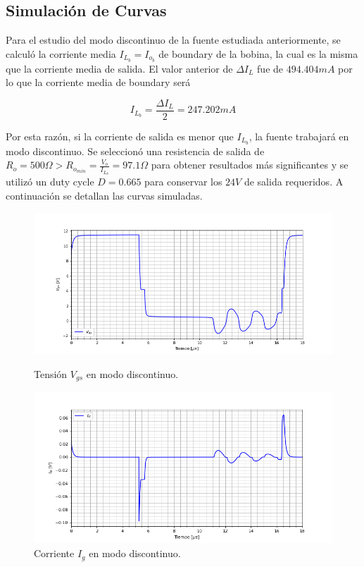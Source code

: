 



\subsection{Simulación de Curvas}

Para el estudio del modo discontinuo de la fuente estudiada anteriormente, se calculó la corriente media $I_{L_b} = I_{o_b}$ de boundary de la bobina, la cual es la misma que la corriente media de salida. El valor anterior de $\Delta I_L$ fue de $494.404mA$ por lo que la corriente media de boundary será

\begin{equation}
I_{L_b} = \frac{\Delta I_L}{2} = 247.202mA
\label{ej4:eq:il_boundary}
\end{equation}

Por esta razón, si la corriente de salida es menor que $I_{L_b}$, la fuente trabajará en modo discontinuo. Se seleccionó una resistencia de salida de $R_o = 500\Omega > R_{o_{min}} = \frac{V_o}{I_{L_b}} = 97.1\Omega$ para obtener resultados más significantes y se utilizó un duty cycle $D = 0.665$ para conservar los $24V$ de salida requeridos. A continuación se detallan las curvas simuladas.

\begin{figure}[H]
	\centering
	\begin{minipage}{0.495\textwidth}
		\centering
		\includegraphics[width=\textwidth]{ImagenesEjercicio-4/vgs}%
		\caption{Tensión $V_{gs}$ en modo discontinuo.}
		\label{ej4:fig:vgs}
	\end{minipage}\hfill
	\begin{minipage}{0.495\textwidth}
		\centering
		\includegraphics[width=\textwidth]{ImagenesEjercicio-4/ig} %
		\caption{Corriente $I_{g}$ en modo discontinuo.}
		\label{ej4:fig:ig}
	\end{minipage}
\end{figure}

